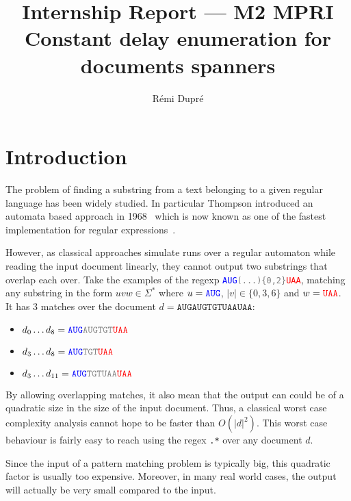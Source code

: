 \documentclass[12px]{article}
\title{%
  Internship Report --- M2 MPRI \\
  Constant delay enumeration for documents spanners
}
\author{Rémi Dupré}
\begin{document}
  \maketitle

  
  \pagebreak

  \section{Introduction}

    The problem of finding a substring from a text belonging to a given
    regular language has been widely studied. In particular Thompson
    introduced an automata based approach in
    1968~\cite{thompson1968programming} which is now known as one of the
    fastest implementation for regular expressions~\cite{cox2007regular}.

    However, as classical approaches simulate runs over a regular automaton
    while reading the input document linearly, they cannot output two
    substrings that overlap each over. Take the examples of the regexp
    \texttt{\textcolor{blue}{AUG}\textcolor{gray}{(...)\{0,2\}}\textcolor{red}{UAA}},
    matching any substring in the form $uvw \in \Sigma^*$ where $u =
    \texttt{\textcolor{blue}{AUG}}$, $|v| \in \{0, 3, 6\}$ and $w =
    \texttt{\textcolor{red}{UAA}}$. It has 3 matches over the document $d =
    \texttt{AUGAUGTGTUAAUAA}$:
      \begin{itemize}
        \item $d_0 \ldots d_8 =
          \texttt{\textcolor{blue}{AUG}\textcolor{gray}{AUGTGT}\textcolor{red}{UAA}}$
        \item $d_3 \ldots d_8 =
          \texttt{\textcolor{blue}{AUG}\textcolor{gray}{TGT}\textcolor{red}{UAA}}$
        \item $d_3 \ldots d_{11} =
          \texttt{\textcolor{blue}{AUG}\textcolor{gray}{TGTUAA}\textcolor{red}{UAA}}$
      \end{itemize}

    By allowing overlapping matches, it also mean that the output can could be
    of a quadratic size in the size of the input document. Thus, a classical
    worst case complexity analysis cannot hope to be faster than $O(|d|^2)$.
    This worst case behaviour is fairly easy to reach using the regex
    \texttt{.*} over any document $d$.

    Since the input of a pattern matching problem is typically big, this
    quadratic factor is usually too expensive. Moreover, in many real world
    cases, the output will actually be very small compared to the input.
\end{document}
